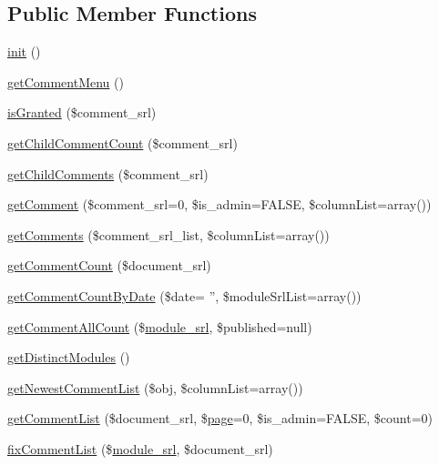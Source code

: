 \subsection*{Public Member Functions}
\begin{DoxyCompactItemize}
\item 
\hyperlink{classcommentModel_a4da59f10ea425e61dbd5bebe73ab9ec1}{init} ()
\item 
\hyperlink{classcommentModel_a74e52809b658711e8d63ba7900eb5246}{get\-Comment\-Menu} ()
\item 
\hyperlink{classcommentModel_aff0bb9049c29d3795fbe2c7eb92a2451}{is\-Granted} (\$comment\-\_\-srl)
\item 
\hyperlink{classcommentModel_adfb890eecf72a039c9f7a28c1e6eb3d2}{get\-Child\-Comment\-Count} (\$comment\-\_\-srl)
\item 
\hyperlink{classcommentModel_ac1acb7d6d8da68e20ec5e6e5a55e5d32}{get\-Child\-Comments} (\$comment\-\_\-srl)
\item 
\hyperlink{classcommentModel_adc900f3123da26b591a20ca7a951e4ac}{get\-Comment} (\$comment\-\_\-srl=0, \$is\-\_\-admin=F\-A\-L\-S\-E, \$column\-List=array())
\item 
\hyperlink{classcommentModel_a435e77a0e774c5b6ba899312e8bea2dd}{get\-Comments} (\$comment\-\_\-srl\-\_\-list, \$column\-List=array())
\item 
\hyperlink{classcommentModel_af28e4e312fad244148fd96bd0e8f0b5f}{get\-Comment\-Count} (\$document\-\_\-srl)
\item 
\hyperlink{classcommentModel_a29b3a6403c25f503f3fb91b4329542ee}{get\-Comment\-Count\-By\-Date} (\$date= '', \$module\-Srl\-List=array())
\item 
\hyperlink{classcommentModel_a6d868da113e98ecde6c6e5cb12ce4cbf}{get\-Comment\-All\-Count} (\$\hyperlink{ko_8install_8php_a370bb6450fab1da3e0ed9f484a38b761}{module\-\_\-srl}, \$published=null)
\item 
\hyperlink{classcommentModel_a4f202e4238ab75645a10db6acaa1f969}{get\-Distinct\-Modules} ()
\item 
\hyperlink{classcommentModel_a89492b8f475e42296e1560b8886bdc01}{get\-Newest\-Comment\-List} (\$obj, \$column\-List=array())
\item 
\hyperlink{classcommentModel_ae43f36bfd32d39f87dac358aa1526f7f}{get\-Comment\-List} (\$document\-\_\-srl, \$\hyperlink{classpage}{page}=0, \$is\-\_\-admin=F\-A\-L\-S\-E, \$count=0)
\item 
\hyperlink{classcommentModel_af9457d8f1128af78c79ea416d591fc13}{fix\-Comment\-List} (\$\hyperlink{ko_8install_8php_a370bb6450fab1da3e0ed9f484a38b761}{module\-\_\-srl}, \$document\-\_\-srl)

\end{DoxyCompactItemize}
